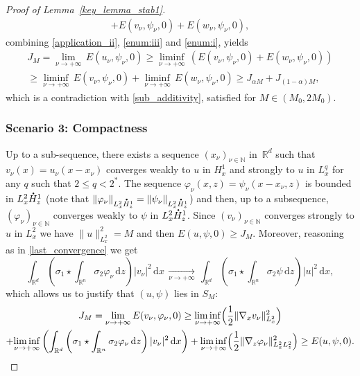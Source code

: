 \documentclass[JEP,XML,SOM,NoEqCountersInSection,NoFloatCountersInSection,Unicode,published]{cedram}
\theoremstyle{definition}
\newcommand*{\overbigdot}[1]{%
\accentset{\mbox{\large\bfseries .}}{#1}}
\newenvironment{ProofOf}[1]{\begin{proof}[Proof of #1]}{\end{proof}}
\newcommand{\R}{\mathbb{R}}
\newcommand{\ud}{\, {\mathrm{d}}}
\begin{document}
\begin{ProofOf}{Lemma~\ref{key_lemma_stab1}}
\begin{multline*}
+E(v_{\nu},\psi_{\nu},0)+E(w_{\nu},\psi_{\nu},0),
\end{multline*}
\egroup
combining \eqref{application_ii}, \eqref{enum:iii} and \eqref{enum:i}, yields
\begin{multline*}
J_{M}=\underset{\nu\to +\infty}{\lim}\,E(u_{\nu},\psi_{\nu},0)\geq\underset{\nu\to+\infty}{\liminf}\,\left(E(v_{\nu},\psi_{\nu},0)+E(w_{\nu},\psi_{\nu},0)\right)\\
\geq\underset{\nu\to+\infty}{\liminf}\,E(v_{\nu},\psi_{\nu},0)+\underset{\nu\to+\infty}{\liminf}\,E(w_{\nu},\psi_{\nu},0)\geq J_{\alpha M}+J_{(1-\alpha)M},
\end{multline*}
which is a contradiction with \eqref{sub_additivity}, satisfied for $M\in (M_0,2M_0)$.

\subsubsection*{Scenario 3: Compactness} Up to a sub-sequence, there exists a sequence $(x_{\nu})_{\nu\in\mathbb N}$ in~$\R^{d}$ such that $v_{\nu}(x)=u_{\nu}(x-x_{\nu})$ converges weakly to $u$ in $H_{x}^{1}$ and strongly to $u$ in $L_{x}^{q}$ for any $q$ such that $2\leq q<2^{*}$. The sequence $\varphi_{\nu}(x,z)=\psi_{\nu}(x-x_{\nu},z)$ is bounded in $L_{x}^{2}\overbigdot{H}_{z}^{1}$ (note that $\|\varphi_{\nu}\|_{L_{x}^{2}\overbigdot{H}_{z}^{1}}=\|\psi_{\nu}\|_{L_{x}^{2}\overbigdot{H}_{z}^{1}}$) and then, up to a subsequence, $(\varphi_{\nu})_{\nu\in\mathbb N}$ converges weakly to $\psi$ in $L_{x}^{2}\overbigdot{H}_{z}^{1}$. Since $(v_{\nu})_{\nu\in\mathbb N}$ converges strongly to $u$ in $L_{x}^{2}$ we have $\|u\|_{L_{x}^{2}}^{2}=M$ and then $E(u,\psi,0)\geq J_{M}$. Moreover, reasoning as in \eqref{last_convergence} we get
\begin{equation}\label{cv1}
\int_{\R^{d}}\left(\sigma_{1}\star\int_{\R^{n}}\sigma_{2}\varphi_{\nu}\ud z\right)|v_{\nu}|^{2}\ud x\,\underset{\nu\to+\infty}{\to}\,\int_{\R^{d}}\left(\sigma_{1}\star\int_{\R^{n}}\sigma_{2}\psi\ud z\right)|u|^{2}\ud x,
\end{equation}
which allows us to justify that $(u,\psi)$ lies in $S_{M}$:
\bgroup
{}
\begin{multline*}
J_{M}=\underset{\nu\to+\infty}{\lim}\,E(v_{\nu},\varphi_{\nu},0)\geq\underset{\nu\to+\infty}{\liminf}\Bigl(\frac{1}{2}\|\nabla_{x}v_{\nu}\|_{L_{x}^{2}}^{2}\Bigr)\\
+\underset{\nu\to +\infty}{\liminf}\left(\int_{\R^{d}}\left(\sigma_{1}\star\int_{\R^{n}}\sigma_{2}\varphi_{\nu}\ud z\right)|v_{\nu}|^{2}\ud x\right)+\underset{\nu\to+\infty}{\liminf}\Bigl(\frac{1}{2}\|\nabla_{z}\varphi_{\nu}\|_{L_{x}^{2}L_{z}^{2}}^{2}\Bigr)\geq E(u,\psi,0).

\end{multline*}
\end{ProofOf}
\end{document}
